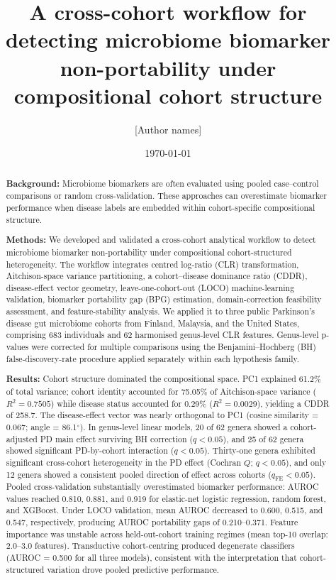 \documentclass[12pt,a4paper]{article}
\title{A cross-cohort workflow for detecting microbiome biomarker
non-portability under compositional cohort structure}
\author[1]{[Author names]}
\affil[1]{[Institution]}
\date{\today}
\begin{document}
\maketitle

\begin{abstract}
\textbf{Background:}
Microbiome biomarkers are often evaluated using pooled case--control
comparisons or random cross-validation. These approaches can overestimate
biomarker performance when disease labels are embedded within
cohort-specific compositional structure.

\textbf{Methods:}
We developed and validated a cross-cohort analytical workflow to detect
microbiome biomarker non-portability under compositional cohort-structured
heterogeneity. The workflow integrates centred log-ratio (CLR)
transformation, Aitchison-space variance partitioning, a cohort--disease
dominance ratio (CDDR), disease-effect vector geometry, leave-one-cohort-out
(LOCO) machine-learning validation, biomarker portability gap (BPG)
estimation, domain-correction feasibility assessment, and feature-stability
analysis. We applied it to three public Parkinson's disease gut microbiome
cohorts from Finland, Malaysia, and the United States, comprising 683
individuals and 62 harmonised genus-level CLR features. Genus-level
p-values were corrected for multiple comparisons using the
Benjamini--Hochberg (BH) false-discovery-rate procedure applied separately
within each hypothesis family.

\textbf{Results:}
Cohort structure dominated the compositional space. PC1 explained 61.2\%
of total variance; cohort identity accounted for 75.05\% of
Aitchison-space variance ($R^2 = 0.7505$) while disease status accounted
for 0.29\% ($R^2 = 0.0029$), yielding a CDDR of 258.7. The disease-effect
vector was nearly orthogonal to PC1 (cosine similarity = 0.067;
angle = 86.1$^\circ$). In genus-level linear models, 20 of 62 genera showed
a cohort-adjusted PD main effect surviving BH correction ($q < 0.05$), and
25 of 62 genera showed significant PD-by-cohort interaction ($q < 0.05$).
Thirty-one genera exhibited significant cross-cohort heterogeneity in the PD
effect (Cochran $Q$; $q < 0.05$), and only 12 genera showed a consistent
pooled direction of effect across cohorts ($q_{\mathrm{FE}} < 0.05$). Pooled
cross-validation substantially overestimated biomarker performance: AUROC
values reached 0.810, 0.881, and 0.919 for elastic-net logistic regression,
random forest, and XGBoost. Under LOCO validation, mean AUROC decreased to
0.600, 0.515, and 0.547, respectively, producing AUROC portability gaps of
0.210--0.371. Feature importance was unstable across held-out-cohort training
regimes (mean top-10 overlap: 2.0--3.0 features). Transductive
cohort-centring produced degenerate classifiers (AUROC = 0.500 for all
three models), consistent with the interpretation that cohort-structured
variation drove pooled predictive performance.


\end{abstract}
\end{document}

